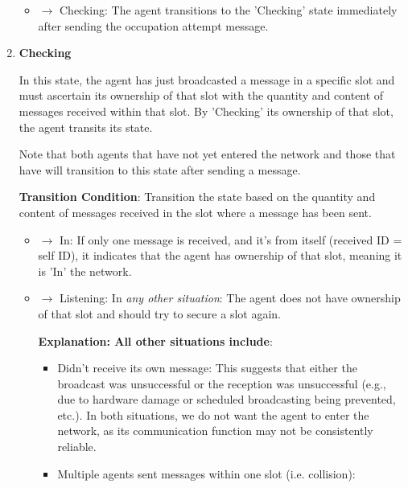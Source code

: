 \begin{enumerate}
    \begin{itemize}
        \item $\rightarrow$ Checking: The agent transitions to the 'Checking' state immediately after sending the occupation attempt message.
    \end{itemize}


    \item \textbf{Checking}
    
    In this state, the agent has just broadcasted a message in a specific slot and must ascertain its ownership of that slot with the quantity and content of messages received within that slot.
    By 'Checking' its ownership of that slot, the agent transits its state.

    Note that both agents that have not yet entered the network and those that have will transition to this state after sending a message.

    \textbf{Transition Condition}: Transition the state based on the quantity and content of messages received in the slot where a message has been sent.
    \begin{itemize}

        \item $\rightarrow$ In: If only one message is received, and it's from itself (received ID = self ID), it indicates that the agent has ownership of that slot, meaning it is 'In' the network.
        \item $\rightarrow$ Listening: In \textit{any other situation}: The agent does not have ownership of that slot and should try to secure a slot again.
        
        \textbf{Explanation: All other situations include}:
        \begin{itemize}
            \item Didn't receive its own message: This suggests that either the broadcast was unsuccessful or the reception was unsuccessful (e.g., due to hardware damage or scheduled broadcasting being prevented, etc.). In both situations, we do not want the agent to enter the network, as its communication function may not be consistently reliable.
            \item Multiple agents sent messages within one slot (i.e. collision):
            

\end{itemize}
\end{itemize}
\end{enumerate}
